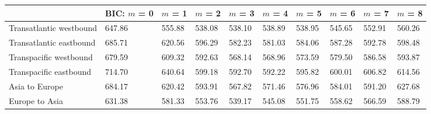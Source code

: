 
\begin{tabular}[t]{llllllllll}
\toprule
  & BIC: $m$ = 0 & $m$ = 1 & $m$ = 2 & $m$ = 3 & $m$ = 4 & $m$ = 5 & $m$ = 6 & $m$ = 7 & $m$ = 8\\
\midrule
Transatlantic westbound & 647.86 & 555.88 & 538.08 & 538.10 & 538.89 & 538.95 & 545.65 & 552.91 & 560.26\\
Transatlantic eastbound & 685.71 & 620.56 & 596.29 & 582.23 & 581.03 & 584.06 & 587.28 & 592.78 & 598.48\\
Transpacific westbound & 679.59 & 609.32 & 592.63 & 568.14 & 568.96 & 573.59 & 579.50 & 586.58 & 593.87\\
Transpacific eastbound & 714.70 & 640.64 & 599.18 & 592.70 & 592.22 & 595.82 & 600.01 & 606.82 & 614.56\\
Asia to Europe & 684.17 & 620.42 & 593.91 & 567.82 & 571.46 & 576.96 & 584.01 & 591.20 & 627.68\\
Europe to Asia & 631.38 & 581.33 & 553.76 & 539.17 & 545.08 & 551.75 & 558.62 & 566.59 & 588.79\\
\bottomrule
\end{tabular}
